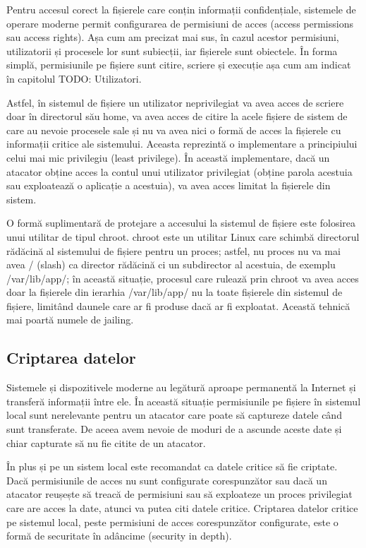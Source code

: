 Pentru accesul corect la fișierele care conțin informații confidențiale, sistemele de operare moderne permit configurarea de permisiuni de acces (access permissions sau access rights). Așa cum am precizat mai sus, în cazul acestor permisiuni, utilizatorii și procesele lor sunt subiecții, iar fișierele sunt obiectele. În forma simplă, permisiunile pe fișiere sunt citire, scriere și execuție așa cum am indicat în capitolul TODO: Utilizatori.

Astfel, în sistemul de fișiere un utilizator neprivilegiat va avea acces de scriere doar în directorul său home, va avea acces de citire la acele fișiere de sistem de care au nevoie procesele sale și nu va avea nici o formă de acces la fișierele cu informații critice ale sistemului. Aceasta reprezintă o implementare a principiului celui mai mic privilegiu (least privilege). În această implementare, dacă un atacator obține acces la contul unui utilizator privilegiat (obține parola acestuia sau exploatează o aplicație a acestuia), va avea acces limitat la fișierele din sistem.

O formă suplimentară de protejare a accesului la sistemul de fișiere este folosirea unui utilitar de tipul chroot. chroot este un utilitar Linux care schimbă directorul rădăcină al sistemului de fișiere pentru un proces; astfel, nu proces nu va mai avea / (slash) ca director rădăcină ci un subdirector al acestuia, de exemplu /var/lib/app/; în această situație, procesul care rulează prin chroot va avea acces doar la fișierele din ierarhia /var/lib/app/ nu la toate fișierele din sistemul de fișiere, limitând daunele care ar fi produse dacă ar fi exploatat. Această tehnică mai poartă numele de jailing.

\subsection{Criptarea datelor}
\label{sec:sec:encryption}

Sistemele și dispozitivele moderne au legătură aproape permanentă la Internet și transferă informații între ele. În această situație permisiunile pe fișiere în sistemul local sunt nerelevante pentru un atacator care poate să captureze datele când sunt transferate. De aceea avem nevoie de moduri de a ascunde aceste date și chiar capturate să nu fie citite de un atacator.

În plus și pe un sistem local este recomandat ca datele critice să fie criptate. Dacă permisiunile de acces nu sunt configurate corespunzător sau dacă un atacator reușește să treacă de permisiuni sau să exploateze un proces privilegiat care are acces la date, atunci va putea citi datele critice. Criptarea datelor critice pe sistemul local, peste permisiuni de acces corespunzător configurate, este o formă de securitate în adâncime (security in depth).

